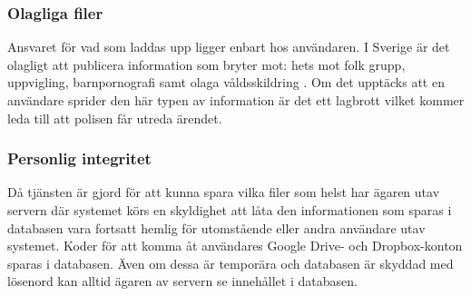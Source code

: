 \subsubsection{Olagliga filer}

Ansvaret för vad som laddas upp ligger enbart hos användaren. I Sverige är det olagligt att publicera information som bryter mot: hets mot folk grupp, uppvigling, barnpornografi samt olaga våldsskildring \cite{polisen}. Om det upptäcks att en användare sprider den här typen av information är det ett lagbrott vilket kommer leda till att polisen får utreda ärendet.

\subsubsection{Personlig integritet}

Då tjänsten är gjord för att kunna spara vilka filer som helst har ägaren utav servern där systemet körs en skyldighet att låta den informationen som sparas i databasen vara fortsatt hemlig för utomstående eller andra användare utav systemet. Koder för att komma åt användares Google Drive- och Dropbox-konton sparas i databasen. Även om dessa är temporära och databasen är skyddad med lösenord kan alltid ägaren av servern se innehållet i databasen.
